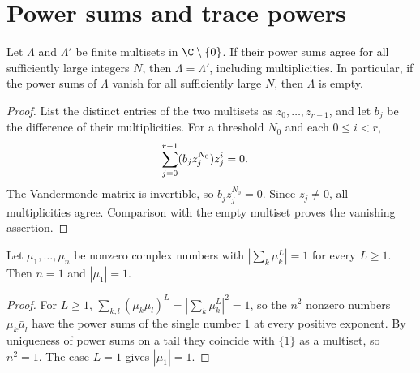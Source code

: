\section{Power sums and trace powers}

\begin{lemma}
    \label{thm:asym_tail_weights}
    \leanok
    Let $\Lambda$ and $\Lambda'$ be finite multisets in $\C\setminus\{0\}$.
    If their power sums agree for all sufficiently large integers $N$, then
    $\Lambda=\Lambda'$, including multiplicities. In particular, if the
    power sums of $\Lambda$ vanish for all sufficiently large $N$, then
    $\Lambda$ is empty.
\end{lemma}

\begin{proof}
    \leanok
    List the distinct entries of the two multisets as
    $z_0,\ldots,z_{r-1}$, and let $b_j$ be the difference of their
    multiplicities. For a threshold $N_0$ and each $0\leq i<r$,
    \begin{align}
        \sum_{j=0}^{r-1}(b_jz_j^{N_0})z_j^i & = 0.
        \notag
    \end{align}
    The Vandermonde matrix is invertible, so $b_jz_j^{N_0}=0$.
    Since $z_j\neq0$, all multiplicities agree. Comparison with the empty
    multiset proves the vanishing assertion.
\end{proof}

\begin{lemma}
    \label{thm:mpoalg_unimodular_power_sum}
    \leanok
    Let $\mu_1,\ldots,\mu_n$ be nonzero complex numbers with
    $\left|\sum_k\mu_k^L\right|=1$ for every $L\geq1$. Then $n=1$ and
    $|\mu_1|=1$.
\end{lemma}

\begin{proof}
    \leanok
    For $L\geq1$,
    $\sum_{k,l}(\mu_k\bar\mu_l)^L=\left|\sum_k\mu_k^L\right|^2=1$, so the
    $n^2$ nonzero numbers $\mu_k\bar\mu_l$ have the power sums of the single
    number $1$ at every positive exponent. By uniqueness of power sums on a
    tail they coincide with $\{1\}$ as a multiset, so $n^2=1$. The case $L=1$
    gives $|\mu_1|=1$.
\end{proof}

